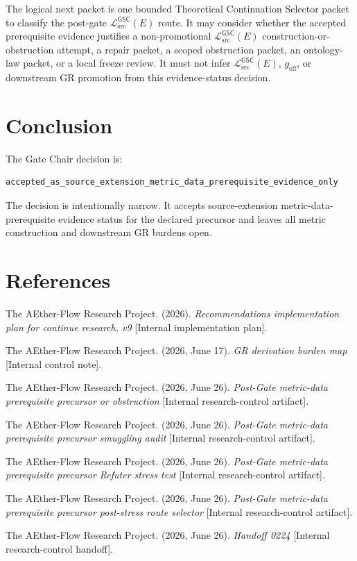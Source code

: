 \documentclass[11pt]{article}
\newcommand{\MetricData}{\mathcal{L}_{\mathrm{src}}^{\mathsf{GSC}}}
\newcommand{\geff}{g_{\mathrm{eff}}}
\begin{document}
The logical next packet is one bounded Theoretical Continuation Selector
packet to classify the post-gate \(\MetricData(E)\) route. It may consider
whether the accepted prerequisite evidence justifies a non-promotional
\(\MetricData(E)\) construction-or-obstruction attempt, a repair packet, a
scoped obstruction packet, an ontology-law packet, or a local freeze review. It
must not infer \(\MetricData(E)\), \(\geff\), or downstream GR promotion from
this evidence-status decision.

\section{Conclusion}

The Gate Chair decision is:

\begin{verbatim}
accepted_as_source_extension_metric_data_prerequisite_evidence_only
\end{verbatim}

The decision is intentionally narrow. It accepts source-extension
metric-data-prerequisite evidence status for the declared precursor and leaves
all metric construction and downstream GR burdens open.

\section*{References}

The AEther-Flow Research Project. (2026). \textit{Recommendations
implementation plan for continue research, v9} [Internal implementation
plan].

The AEther-Flow Research Project. (2026, June 17). \textit{GR derivation
burden map} [Internal control note].

The AEther-Flow Research Project. (2026, June 26). \textit{Post-Gate
metric-data prerequisite precursor or obstruction} [Internal research-control
artifact].

The AEther-Flow Research Project. (2026, June 26). \textit{Post-Gate
metric-data prerequisite precursor smuggling audit} [Internal research-control
artifact].

The AEther-Flow Research Project. (2026, June 26). \textit{Post-Gate
metric-data prerequisite precursor Refuter stress test} [Internal
research-control artifact].

The AEther-Flow Research Project. (2026, June 26). \textit{Post-Gate
metric-data prerequisite precursor post-stress route selector} [Internal
research-control artifact].

The AEther-Flow Research Project. (2026, June 26). \textit{Handoff 0224}
[Internal research-control handoff].
\end{document}
